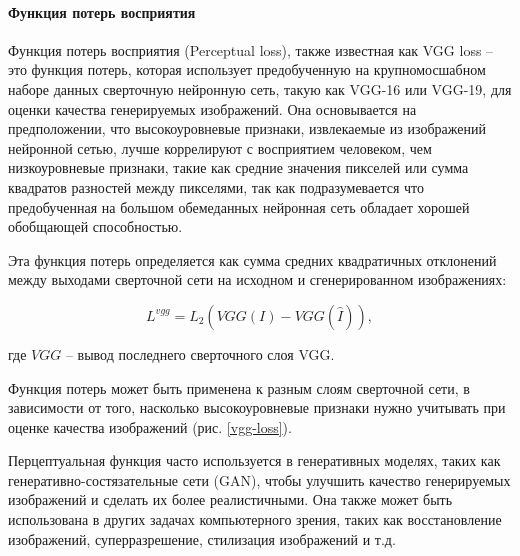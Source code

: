 \paragraph{Функция потерь восприятия}

Функция потерь восприятия (Perceptual loss), также известная как VGG loss -- это функция потерь, которая использует предобученную на крупномосшабном наборе данных сверточную нейронную сеть, такую как VGG-16 или VGG-19, для оценки качества генерируемых изображений. Она основывается на предположении, что высокоуровневые признаки, извлекаемые из изображений нейронной сетью, лучше коррелируют с восприятием человеком, чем низкоуровневые признаки, такие как средние значения пикселей или сумма квадратов разностей между пикселями, так как подразумевается что предобученная на большом обемеданных нейронная сеть обладает хорошей обобщающей способностью.

Эта функция потерь определяется как сумма средних квадратичных отклонений между выходами сверточной сети на исходном и сгенерированном изображениях:

\begin{equation}
    \label{eq:2-1-3-1}
    L^{vgg} = L_{2}(VGG(I)-VGG(\hat{I})),
\end{equation}

где $VGG$ -- вывод последнего сверточного слоя VGG.

Функция потерь может быть применена к разным слоям сверточной сети, в зависимости от того, насколько высокоуровневые признаки нужно учитывать при оценке качества изображений (рис. \ref{vgg-loss}). 


Перцептуальная функция часто используется в генеративных моделях, таких как генеративно-состязательные сети (GAN), чтобы улучшить качество генерируемых изображений и сделать их более реалистичными. Она также может быть использована в других задачах компьютерного зрения, таких как восстановление изображений, суперразрешение, стилизация изображений и т.д.